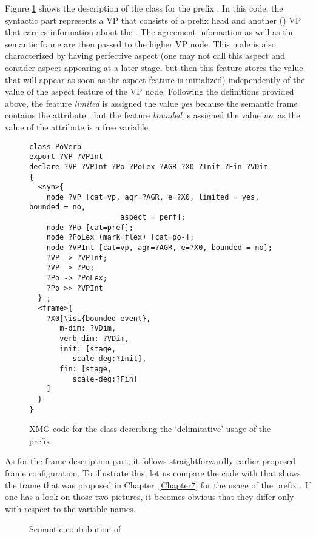 Figure \ref{code:po} shows the  description of the class for the prefix . In this code, the syntactic part represents a VP that consists of a prefix head and another () VP that carries information about the . The agreement information as well as the semantic frame are then passed to the higher VP node. This node is also characterized by having perfective aspect (one may not call this aspect and consider aspect appearing at a later stage, but then this feature stores the value that will appear as soon as the aspect feature is initialized) independently of the value of the aspect feature of the  VP node. Following the definitions provided above, the feature \textit{limited} is assigned the value \textit{yes} because the semantic frame contains the attribute \FIN, but the feature \textit{bounded} is assigned the value \textit{no}, as the value of the attribute \FIN is a free variable.

\begin{figure}
\begin{lstlisting}[style=xmg]
class PoVerb
export ?VP ?VPInt
declare ?VP ?VPInt ?Po ?PoLex ?AGR ?X0 ?Init ?Fin ?VDim
{
  <syn>{
    node ?VP [cat=vp, agr=?AGR, e=?X0, limited = yes, bounded = no, 
    				 aspect = perf];
    node ?Po [cat=pref];
    node ?PoLex (mark=flex) [cat=po-];
    node ?VPInt [cat=vp, agr=?AGR, e=?X0, bounded = no];
    ?VP -> ?VPInt;
    ?VP -> ?Po;
    ?Po -> ?PoLex;
    ?Po >> ?VPInt
  } ;
  <frame>{
    ?X0[\isi{bounded-event},
       m-dim: ?VDim,
       verb-dim: ?VDim,
       init: [stage, 
          scale-deg:?Init],
       fin: [stage, 
          scale-deg:?Fin]    
    ]
  }
}
\end{lstlisting}
\caption{XMG code for the class describing the `delimitative' usage of the prefix \label{code:po}}
\end{figure}

As for the frame description part, it follows straightforwardly earlier proposed frame configuration. To illustrate this, let us compare the code with  that shows the frame that was proposed in Chapter~\ref{Chapter7} for the  usage of the prefix . If one has a look on those two pictures, it becomes obvious that they differ only with respect to the variable names. 

\begin{figure}
\caption{Semantic contribution of \label{frame:po:delim:rep}}
\end{figure}

